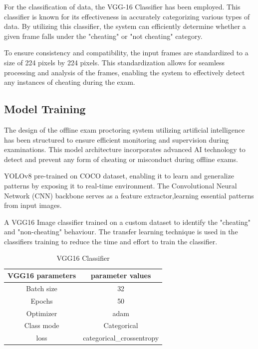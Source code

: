 \documentclass[conference]{IEEEtran}
\begin{document}
For the classification of data, the VGG-16 Classifier has been employed. This classifier is known for its effectiveness in accurately categorizing various types of data. By utilizing this classifier, the system can efficiently determine whether a given frame falls under the "cheating" or "not cheating" category.

To ensure consistency and compatibility, the input frames are standardized to a size of 224 pixels by 224 pixels. This standardization allows for seamless processing and analysis of the frames, enabling the system to effectively detect any instances of cheating during the exam.


\subsection{Model Training}
The design of the offline exam proctoring system utilizing artificial intelligence has been structured to ensure efficient monitoring and supervision during examinations. This model architecture incorporates advanced AI technology to detect and prevent any form of cheating or misconduct during offline exams.

YOLOv8 pre-trained on COCO dataset, enabling it to learn and generalize patterns by exposing it to real-time environment. The Convolutional Neural Network (CNN) backbone serves as a feature extractor,learning essential patterns from input images.

A VGG16 Image classifier trained on a custom dataset to identify the "cheating" and "non-cheating" behaviour. The transfer learning technique is used in the classifiers training to reduce the time and effort to train the classifier.
\begin{table}[htbp]
\caption{VGG16 Classifier}
\label{tab2} %
\begin{center}
\begin{tabular}{|c|c|}
\hline
\textbf{VGG16 parameters} & \textbf{parameter values} \\ %
\hline
Batch size & 32 \\ %
\hline
Epochs& 50 \\
\hline
Optimizer& adam\\
\hline
Class mode& Categorical\\
\hline
loss & categorical\_crossentropy \\

\hline
\end{tabular}
\end{center}
\end{table}
\end{document}
